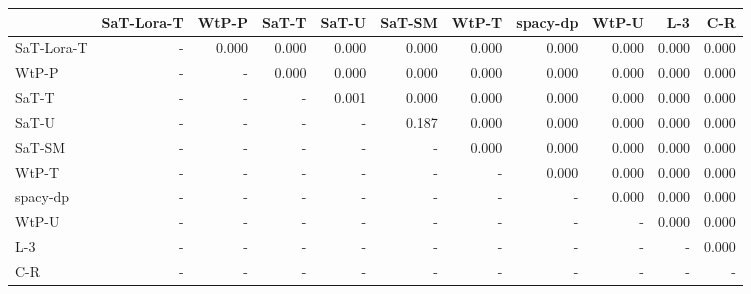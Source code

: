 \begin{tabular}{lrrrrrrrrrr}
\toprule
 & SaT-Lora-T & WtP-P & SaT-T & SaT-U & SaT-SM & WtP-T & spacy-dp & WtP-U & L-3 & C-R \\
\midrule
SaT-Lora-T & - & 0.000 & 0.000 & 0.000 & 0.000 & 0.000 & 0.000 & 0.000 & 0.000 & 0.000 \\
WtP-P & - & - & 0.000 & 0.000 & 0.000 & 0.000 & 0.000 & 0.000 & 0.000 & 0.000 \\
SaT-T & - & - & - & 0.001 & 0.000 & 0.000 & 0.000 & 0.000 & 0.000 & 0.000 \\
SaT-U & - & - & - & - & 0.187 & 0.000 & 0.000 & 0.000 & 0.000 & 0.000 \\
SaT-SM & - & - & - & - & - & 0.000 & 0.000 & 0.000 & 0.000 & 0.000 \\
WtP-T & - & - & - & - & - & - & 0.000 & 0.000 & 0.000 & 0.000 \\
spacy-dp & - & - & - & - & - & - & - & 0.000 & 0.000 & 0.000 \\
WtP-U & - & - & - & - & - & - & - & - & 0.000 & 0.000 \\
L-3 & - & - & - & - & - & - & - & - & - & 0.000 \\
C-R & - & - & - & - & - & - & - & - & - & - \\
\bottomrule
\end{tabular}

